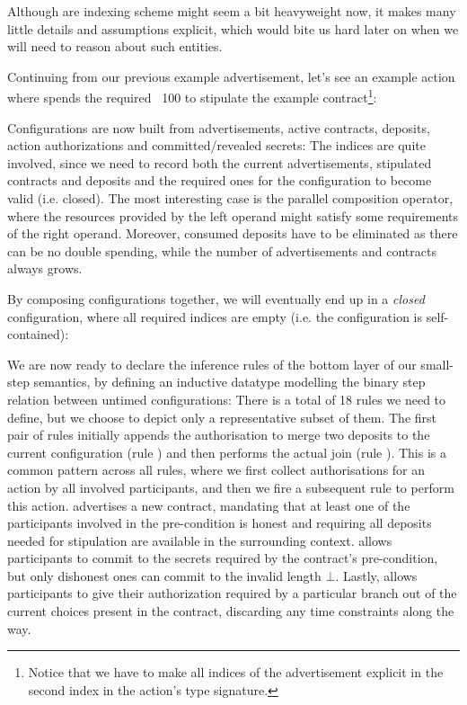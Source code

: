 \documentclass[acmsmall,nonacm=true,screen=true]{acmart}
\begin{document}
Although are indexing scheme might seem a bit heavyweight now, it makes many little details and assumptions explicit,
which would bite us hard later on when we will need to reason about such entities.

Continuing from our previous example advertisement, let's see an example action where \inlineA{} spends the required \bitcoin ~100
to stipulate the example contract\footnote{
Notice that we have to make all indices of the advertisement explicit in the second index in the action's type signature.
}:
\BITactionExample{}

Configurations are now built from advertisements, active contracts, deposits, action authorizations and committed/revealed secrets:
\BITconfigurations{}
The indices are quite involved, since we need to record both the current advertisements, stipulated contracts and deposits
and the required ones for the configuration to become valid (i.e. closed). The most interesting case is the parallel composition
operator, where the resources provided by the left operand might satisfy some requirements of the right operand. Moreover,
consumed deposits have to be eliminated as there can be no double spending, while the number of advertisements and contracts
always grows.

By composing configurations together, we will eventually end up in a \textit{closed} configuration, where 
all required indices are empty (i.e. the configuration is self-contained):
\BITclosedConfigurations{}

We are now ready to declare the inference rules of the bottom layer of our small-step semantics,
by defining an inductive datatype modelling the binary step relation between untimed configurations:
\BITrules{}
There is a total of 18 rules we need to define, but we choose to depict only a representative subset of them.
The first pair of rules initially appends the authorisation to merge
two deposits to the current configuration (rule \inlineAuthJoinRule{}) and then performs the actual join (rule \inlineJoinRule{}).
This is a common pattern across all rules, where we first collect authorisations for an action by all involved participants,
and then we fire a subsequent rule to perform this action.
\inlineAdvertiseRule{} advertises a new contract, mandating that at least one of the participants involved in the pre-condition
is honest and requiring all deposits needed for stipulation are available in the surrounding context.
\inlineAuthCommitRule{} allows participants to commit to the secrets required by the contract's pre-condition, but only dishonest
ones can commit to the invalid length $\bot$.
Lastly, \inlineControlRule{} allows participants to give their authorization required by a particular branch out of the current
choices present in the contract, discarding any time constraints along the way.
\end{document}
